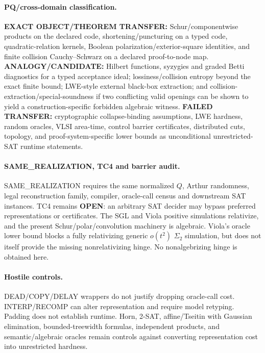 \documentclass[11pt]{article}
\begin{document}
\paragraph{PQ/cross-domain classification.}
\textbf{EXACT OBJECT/THEOREM TRANSFER:} Schur/componentwise products on the declared code, shortening/puncturing on a typed code, quadratic-relation kernels, Boolean polarization/exterior-square identities, and finite collision Cauchy--Schwarz on a declared proof-to-node map.
\textbf{ANALOGY/CANDIDATE:} Hilbert functions, syzygies and graded Betti diagnostics for a typed acceptance ideal; lossiness/collision entropy beyond the exact finite bound; LWE-style external black-box extraction; and collision-extraction/special-soundness if two conflicting valid openings can be shown to yield a construction-specific forbidden algebraic witness.
\textbf{FAILED TRANSFER:} cryptographic collapse-binding assumptions, LWE hardness, random oracles, VLSI area-time, control barrier certificates, distributed cuts, topology, and proof-system-specific lower bounds as unconditional unrestricted-SAT runtime statements.

\paragraph{SAME\_REALIZATION, TC4 and barrier audit.}
SAME\_REALIZATION requires the same normalized \(Q\), Arthur randomness, legal reconstruction family, compiler, oracle-call census and downstream SAT instances. TC4 remains \textbf{OPEN}: an arbitrary SAT decider may bypass preferred representations or certificates. The SGL and Viola positive simulations relativize, and the present Schur/polar/convolution machinery is algebraic. Viola's oracle lower bound blocks a fully relativizing generic \(o(t^2)\) \(\Sigma_2\) simulation, but does not itself provide the missing nonrelativizing hinge. No nonalgebrizing hinge is obtained here.

\paragraph{Hostile controls.}
DEAD/COPY/DELAY wrappers do not justify dropping oracle-call cost. INTERP/RECOMP can alter representation and require model retyping. Padding does not establish runtime. Horn, 2-SAT, affine/Tseitin with Gaussian elimination, bounded-treewidth formulas, independent products, and semantic/algebraic oracles remain controls against converting representation cost into unrestricted hardness.
\end{document}
